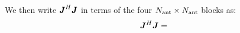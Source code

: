 \documentclass[useAMS,usenatbib]{mn2e}
\makeatletter
\newcommand{\mat}[1]{{\bmath{#1}}}
\newcommand{\JJ}{\mat{J}} %
\newcommand{\Matrix}[2]{\left [ \begin{array}{@{}#1@{}}#2\end{array} \right ]}
\numberwithin{equation}{section}
\providecommand{\DIFaddbegin}{} %
\providecommand{\DIFaddend}{} %
\providecommand{\DIFdelbegin}{} %
\providecommand{\DIFdelend}{} %
\makeatother
\begin{document}
\DIFdelbegin %
\DIFdelend \DIFaddbegin \newcommand{\JHJblocksFull}[4]{
\Matrix{c@{}c@{}c}{
 #1 & \bigg |~ & #2 \\[10pt]
 \hdashline \\[-8pt]
 #3 & \bigg |~ & #4 }
}
\DIFaddend 

\DIFdelbegin %
\DIFdelend \DIFaddbegin \newcommand{\JHJblocks}[2]{
\Matrix{c@{}c@{}c}{
 #1 & \big |~ & \nearrow^H \\
 \hdashline \\[-8pt]
 #2 & \bigg |~ & \searrow~~ }
}
\DIFaddend 

We then write $\JJ^H\JJ$ in terms of the four $N_\mathrm{ant}\times N_\mathrm{ant}$ blocks as:
\begin{equation}
\label{eq:JHJ:DI}
\JJ^H \JJ = 
\DIFdelbegin %
\end{equation}%

\end{document}
